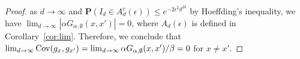 \documentclass[a4paper,11pt]{article}
\theoremstyle{plain}
\theoremstyle{definition}
\begin{document}
\begin{proof}
  as $d\to\infty$ and
  $\mathbf{P}(I_d\in A_d^c(\epsilon))\le e^{-2\epsilon^2 d^{2\delta}}$
  by Hoeffding's inequality, we have
  $\lim_{d\to\infty}|\alpha G_{\alpha,\emptyset}(x,x')|=0$,
  where $A_d(\epsilon)$ is defined in Corollary~\ref{cor:lim}.
  Therefore, we conclude that
  $\lim_{d\to\infty}{\rm Cov}(g_x,g_{x'})=\lim_{d\to\infty}\alpha G_{\alpha,\emptyset}(x,x')/\beta=0$ for $x\neq x'$.

\end{proof}
\end{document}
